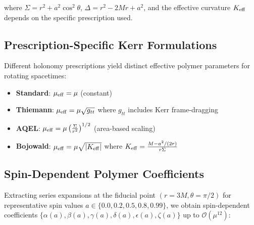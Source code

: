\documentclass[11pt]{article}
\begin{document}
where $\Sigma = r^2 + a^2\cos^2\theta$, $\Delta = r^2 - 2Mr + a^2$, and the effective curvature $K_{\rm eff}$ depends on the specific prescription used.

\subsection{Prescription-Specific Kerr Formulations}

Different holonomy prescriptions yield distinct effective polymer parameters for rotating spacetimes:

\begin{itemize}
\item \textbf{Standard}: $\mu_{\rm eff} = \mu$ (constant)
\item \textbf{Thiemann}: $\mu_{\rm eff} = \mu \sqrt{g_{tt}}$ where $g_{tt}$ includes Kerr frame-dragging
\item \textbf{AQEL}: $\mu_{\rm eff} = \mu \left(\frac{\Sigma}{r^2}\right)^{1/2}$ (area-based scaling)
\item \textbf{Bojowald}: $\mu_{\rm eff} = \mu \sqrt{|K_{\rm eff}|}$ where $K_{\rm eff} = \frac{M - a^2/(2r)}{r\Sigma}$
\end{itemize}

\subsection{Spin-Dependent Polymer Coefficients}

Extracting series expansions at the fiducial point $(r=3M, \theta=\pi/2)$ for representative spin values $a \in \{0.0, 0.2, 0.5, 0.8, 0.99\}$, we obtain spin-dependent coefficients $\{\alpha(a), \beta(a), \gamma(a), \delta(a), \epsilon(a), \zeta(a)\}$ up to $\mathcal{O}(\mu^{12})$:
\end{document}
